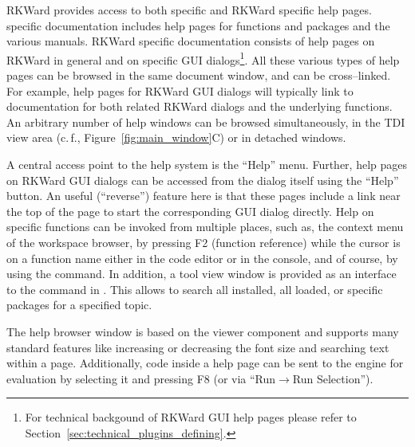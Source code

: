 RKWard provides access to both  specific and 
RKWard specific help pages.
 specific documentation includes help pages for functions and packages 
and the various  manuals. RKWard specific documentation consists of
help pages on RKWard in general and on specific GUI dialogs\footnote{For technical 
backgound of RKWard GUI help pages please refer to Section~\ref{sec:technical_plugins_defining}.}. 
All these various types of help pages can be browsed in the same document 
window, and can be cross--linked. For example, help pages for
RKWard GUI dialogs will typically link to documentation for both
related RKWard dialogs and the underlying  functions.
An arbitrary number of help windows can be browsed simultaneously, in the
TDI view area (c.\,f., Figure~\ref{fig:main_window}C) or in detached windows.


A central access point to the help system is the ``Help'' menu. Further, help pages on
RKWard GUI dialogs can be accessed from the dialog itself using the
``Help'' button. An useful (``reverse'') feature here is that these pages include 
a link near the top of the page to start the corresponding GUI dialog directly.
Help on  specific functions can be invoked from multiple places, 
such as, the context menu of the workspace browser, by pressing F2 (function
reference) while the cursor is on a function name either in the code editor or 
in the  console, and of course, by using the  
command. In addition, a tool view window is provided as an interface to the
 command in . This allows to search all installed, 
all loaded, or specific  packages for a specified topic.

The help browser window is based on the 
 viewer component and supports many standard
features like increasing or decreasing the font size and searching text
within a page. Additionally,  code inside a help
page can be sent to the  engine for
evaluation by selecting it and pressing F8 (or via ``Run$\rightarrow$Run
Selection'').
